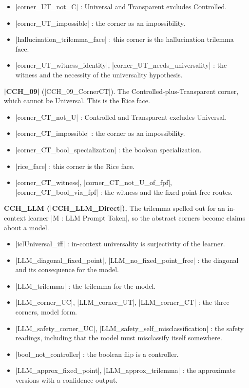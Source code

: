 \documentclass{memoir}
\begin{document}
\begin{itemize}
\item \LeanVerb|corner_UT_not_C| : Universal and Transparent excludes Controlled.
\item \LeanVerb|corner_UT_impossible| : the corner as an impossibility.
\item \LeanVerb|hallucination_trilemma_face| : this corner is the hallucination trilemma face.
\item \LeanVerb|corner_UT_witness_identity|, \LeanVerb|corner_UT_needs_universality| : the witness and
   the necessity of the universality hypothesis.

\end{itemize}


\textbf{\LeanVerb|CCH_09|} (\LeanVerb|CCH_09_CornerCT|). The Controlled-plus-Transparent corner, which cannot
be Universal. This is the Rice face.

\begin{itemize}
\item \LeanVerb|corner_CT_not_U| : Controlled and Transparent excludes Universal.
\item \LeanVerb|corner_CT_impossible| : the corner as an impossibility.
\item \LeanVerb|corner_CT_bool_specialization| : the boolean specialization.
\item \LeanVerb|rice_face| : this corner is the Rice face.
\item \LeanVerb|corner_CT_witness|, \LeanVerb|corner_CT_not_U_of_fpf|, \LeanVerb|corner_CT_bool_via_fpf| : the
   witness and the fixed-point-free routes.

\end{itemize}


\textbf{CCH\_LLM (\LeanVerb|CCH_LLM_Direct|).} The trilemma spelled out for an in-context learner \LeanVerb|M : LLM Prompt Token|,
so the abstract corners become claims about a model.

\begin{itemize}
\item \LeanVerb|iclUniversal_iff| : in-context universality is surjectivity of the learner.
\item \LeanVerb|LLM_diagonal_fixed_point|, \LeanVerb|LLM_no_fixed_point_free| : the diagonal and its
   consequence for the model.
\item \LeanVerb|LLM_trilemma| : the trilemma for the model.
\item \LeanVerb|LLM_corner_UC|, \LeanVerb|LLM_corner_UT|, \LeanVerb|LLM_corner_CT| : the three corners, model
   form.
\item \LeanVerb|LLM_safety_corner_UC|, \LeanVerb|LLM_safety_self_misclassification| : the safety
   readings, including that the model must misclassify itself somewhere.
\item \LeanVerb|bool_not_controller| : the boolean flip is a controller.
\item \LeanVerb|LLM_approx_fixed_point|, \LeanVerb|LLM_approx_trilemma| : the approximate versions with a
   confidence output.

\end{itemize}
\end{document}

